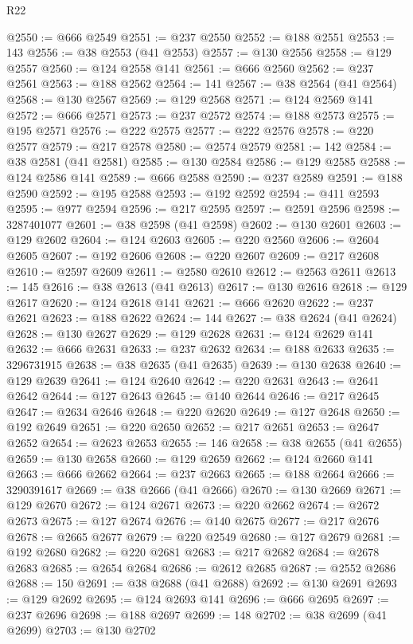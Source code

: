 \begin{lexlean}{R22}
\begin{coremodule}
@2550 := @666 @2549
@2551 := @237 @2550
@2552 := @188 @2551
@2553 := 143
@2556 := @38 @2553 (@41 @2553)
@2557 := @130 @2556
@2558 := @129 @2557
@2560 := @124 @2558 @141
@2561 := @666 @2560
@2562 := @237 @2561
@2563 := @188 @2562
@2564 := 141
@2567 := @38 @2564 (@41 @2564)
@2568 := @130 @2567
@2569 := @129 @2568
@2571 := @124 @2569 @141
@2572 := @666 @2571
@2573 := @237 @2572
@2574 := @188 @2573
@2575 := @195 @2571
@2576 := @222 @2575
@2577 := @222 @2576
@2578 := @220 @2577
@2579 := @217 @2578
@2580 := @2574 @2579
@2581 := 142
@2584 := @38 @2581 (@41 @2581)
@2585 := @130 @2584
@2586 := @129 @2585
@2588 := @124 @2586 @141
@2589 := @666 @2588
@2590 := @237 @2589
@2591 := @188 @2590
@2592 := @195 @2588
@2593 := @192 @2592
@2594 := @411 @2593
@2595 := @977 @2594
@2596 := @217 @2595
@2597 := @2591 @2596
@2598 := 3287401077
@2601 := @38 @2598 (@41 @2598)
@2602 := @130 @2601
@2603 := @129 @2602
@2604 := @124 @2603
@2605 := @220 @2560
@2606 := @2604 @2605
@2607 := @192 @2606
@2608 := @220 @2607
@2609 := @217 @2608
@2610 := @2597 @2609
@2611 := @2580 @2610
@2612 := @2563 @2611
@2613 := 145
@2616 := @38 @2613 (@41 @2613)
@2617 := @130 @2616
@2618 := @129 @2617
@2620 := @124 @2618 @141
@2621 := @666 @2620
@2622 := @237 @2621
@2623 := @188 @2622
@2624 := 144
@2627 := @38 @2624 (@41 @2624)
@2628 := @130 @2627
@2629 := @129 @2628
@2631 := @124 @2629 @141
@2632 := @666 @2631
@2633 := @237 @2632
@2634 := @188 @2633
@2635 := 3296731915
@2638 := @38 @2635 (@41 @2635)
@2639 := @130 @2638
@2640 := @129 @2639
@2641 := @124 @2640
@2642 := @220 @2631
@2643 := @2641 @2642
@2644 := @127 @2643
@2645 := @140 @2644
@2646 := @217 @2645
@2647 := @2634 @2646
@2648 := @220 @2620
@2649 := @127 @2648
@2650 := @192 @2649
@2651 := @220 @2650
@2652 := @217 @2651
@2653 := @2647 @2652
@2654 := @2623 @2653
@2655 := 146
@2658 := @38 @2655 (@41 @2655)
@2659 := @130 @2658
@2660 := @129 @2659
@2662 := @124 @2660 @141
@2663 := @666 @2662
@2664 := @237 @2663
@2665 := @188 @2664
@2666 := 3290391617
@2669 := @38 @2666 (@41 @2666)
@2670 := @130 @2669
@2671 := @129 @2670
@2672 := @124 @2671
@2673 := @220 @2662
@2674 := @2672 @2673
@2675 := @127 @2674
@2676 := @140 @2675
@2677 := @217 @2676
@2678 := @2665 @2677
@2679 := @220 @2549
@2680 := @127 @2679
@2681 := @192 @2680
@2682 := @220 @2681
@2683 := @217 @2682
@2684 := @2678 @2683
@2685 := @2654 @2684
@2686 := @2612 @2685
@2687 := @2552 @2686
@2688 := 150
@2691 := @38 @2688 (@41 @2688)
@2692 := @130 @2691
@2693 := @129 @2692
@2695 := @124 @2693 @141
@2696 := @666 @2695
@2697 := @237 @2696
@2698 := @188 @2697
@2699 := 148
@2702 := @38 @2699 (@41 @2699)
@2703 := @130 @2702

\end{coremodule}
\end{lexlean}

